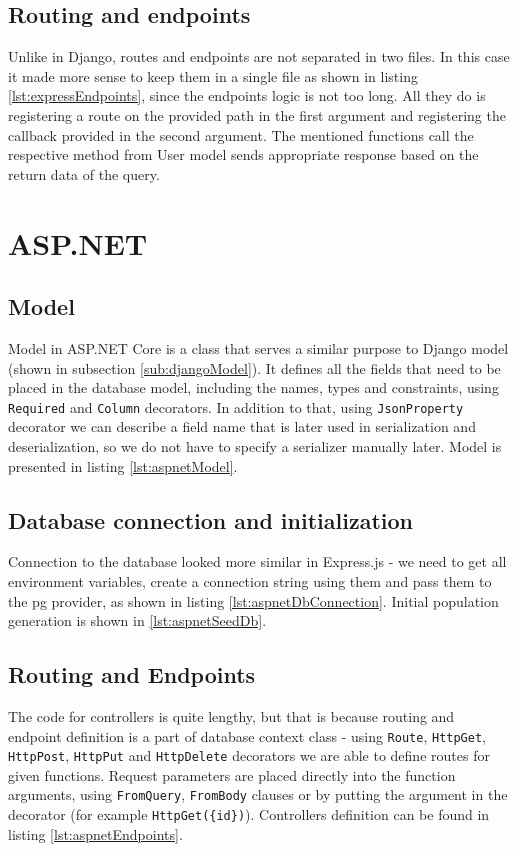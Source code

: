 \subsection{Routing and endpoints}
Unlike in Django, routes and endpoints are not separated in two files. In this case it made more sense to keep them in a single file as shown in listing \ref{lst:expressEndpoints}, since the endpoints logic is not too long. All they do is registering a route on the provided path in the first argument and registering the callback provided in the second argument. The mentioned functions call the respective method from User model sends appropriate response based on the return data of the query.


%
%
\section{ASP.NET}
\subsection{Model}
Model in ASP.NET Core is a class that serves a similar purpose to Django model (shown in subsection \ref{sub:djangoModel}). It defines all the fields that need to be placed in the database model, including the names, types and constraints, using \lstinline{Required} and \lstinline{Column} decorators. In addition to that, using \lstinline{JsonProperty} decorator we can describe a field name that is later used in serialization and deserialization, so we do not have to specify a serializer manually later. Model is presented in listing \ref{lst:aspnetModel}.


\subsection{Database connection and initialization}
Connection to the database looked more similar in Express.js - we need to get all environment variables, create a connection string using them and pass them to the \acrlong{pg} provider, as shown in listing \ref{lst:aspnetDbConnection}. Initial population generation is shown in \ref{lst:aspnetSeedDb}.



\subsection{Routing and Endpoints}
The code for controllers is quite lengthy, but that is because routing and endpoint definition is a part of database context class - using \lstinline{Route}, \lstinline{HttpGet}, \lstinline{HttpPost}, \lstinline{HttpPut} and \lstinline{HttpDelete} decorators we are able to define routes for given functions. Request parameters are placed directly into the function arguments, using \lstinline{FromQuery}, \lstinline{FromBody} clauses or by putting the argument in the decorator (for example \lstinline[mathescape]!HttpGet({id})!). Controllers definition can be found in listing \ref{lst:aspnetEndpoints}.


